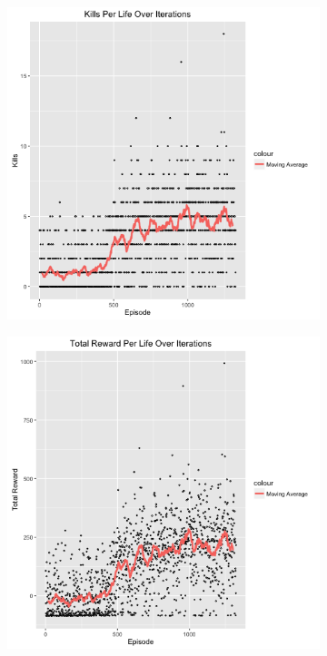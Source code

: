 \documentclass{article}
\begin{document}
\begin{multicols}{2}
\begin{figure}[H]
\caption{Results on Easy Difficulty}
\begin{subfigure}{.25\textwidth}
  \centering
  \includegraphics[scale=0.27]{./kills.png}
  \caption{}
  \label{fig:sfig4}
\end{subfigure}
\begin{subfigure}{.25\textwidth}
  \centering
  \includegraphics[scale=0.27]{./reward.png}

\end{subfigure}
\end{figure}
\end{multicols}
\end{document}

